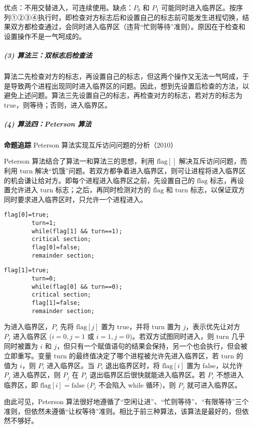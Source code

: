 \documentclass{ctexbook}
\begin{document}
	优点：不用交替进入，可连续使用。缺点：$P_0$ 和 $P_1$ 可能同时进入临界区。按序列①②③④执行时，即检查对方标志后和设置自己的标志前可能发生进程切换，结果双方都检查通过，会同时进入临界区（违背“忙则等待”准则）。原因在于检查和设置操作不是一气呵成的。
	
	\subparagraph{(3) 算法三：双标志后检查法}
	
	算法二先检查对方的标志，再设置自己的标志，但这两个操作又无法一气呵成，于是导致两个进程出现同时进入临界区的问题。因此，想到先设置后检查的方法，以避免上述问题。算法三先设置自己的标志，再检查对方的标志，若对方的标志为 $\text{true}$，则等待；否则，进入临界区。
	
	\subparagraph{(4) 算法四：Peterson 算法}
	
	\textbf{命题追踪} Peterson 算法实现互斥访问问题的分析（2010）
	
	Peterson 算法结合了算法一和算法三的思想，利用 $\text{flag}[]$ 解决互斥访问问题，而利用 $\text{turn}$ 解决“饥饿”问题。若双方都争着进入临界区，则可让进程将进入临界区的机会谦让给对方。即每个进程进入临界区之前，先设置自己的 $\text{flag}$ 标志，再设置允许进入 $\text{turn}$ 标志；之后，再同时检测对方的 $\text{flag}$ 和 $\text{turn}$ 标志，以保证双方同时要求进入临界区时，只允许一个进程进入。
	
	\begin{lstlisting}[caption={进程 P0}, label={lst:p0}]
		flag[0]=true;
		turn=1;
		while(flag[1] && turn==1);
		critical section;
		flag[0]=false;
		remainder section;
	\end{lstlisting}
	
	\begin{lstlisting}[caption={进程 P1}, label={lst:p1}]
		flag[1]=true;
		turn=0;
		while(flag[0] && turn==0);
		critical section;
		flag[1]=false;
		remainder section;
	\end{lstlisting}
	
	为进入临界区，$P_i$ 先将 $\text{flag}[j]$ 置为 $\text{true}$，并将 $\text{turn}$ 置为 $j$，表示优先让对方 $P_j$ 进入临界区 ($i=0, j=1$ 或 $i=1, j=0$)。若双方试图同时进入，则 $\text{turn}$ 几乎同时被置为 $i$ 和 $j$，但只有一个赋值语句的结果会保持，另一个也会执行，但会被立即重写。变量 $\text{turn}$ 的最终值决定了哪个进程被允许先进入临界区，若 $\text{turn}$ 的值为 $i$，则 $P_i$ 进入临界区。当 $P_i$ 退出临界区时，将 $\text{flag}[i]$ 置为 $\text{false}$，以允许 $P_j$ 进入临界区，则 $P_j$ 在 $P_i$ 退出临界区后很快就能进入临界区。若 $P_i$ 不想进入临界区，即 $\text{flag}[i] = \text{false}$ ($P_j$ 不会陷入 while 循环)，则 $P_j$ 就可进入临界区。
	
	由此可见，Peterson 算法很好地遵循了“空闲让进”、“忙则等待”、“有限等待”三个准则，但依然未遵循“让权等待”准则。相比于前三种算法，该算法是最好的，但依然不够好。
	
\end{document}
